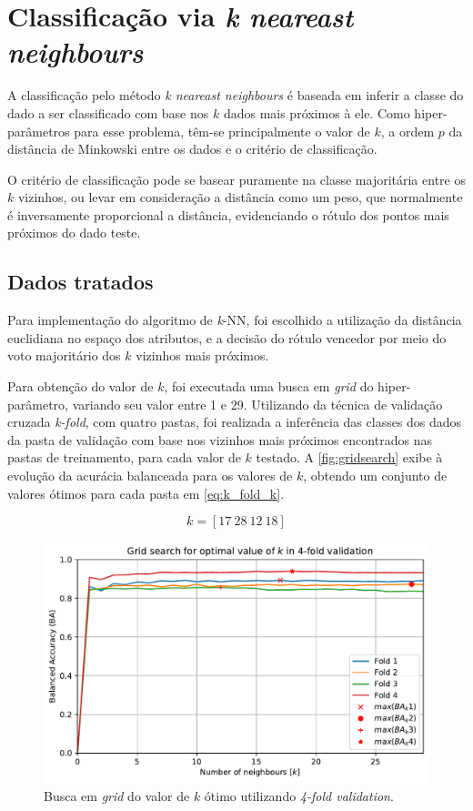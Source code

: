 \clearpage
\section{Classificação via \textit{k neareast neighbours}}

A classificação pelo método \textit{k neareast neighbours} é baseada em inferir a classe do dado a ser classificado com base nos $k$ dados mais próximos à ele. Como hiper-parâmetros para esse problema, têm-se principalmente o valor de $k$, a ordem $p$ da distância de Minkowski entre os dados e o critério de classificação.

O critério de classificação pode se basear puramente na classe majoritária entre os $k$ vizinhos, ou levar em consideração a distância como um peso, que normalmente é inversamente proporcional a distância, evidenciando o rótulo dos pontos mais próximos do dado teste.


\subsection{Dados tratados}

Para implementação do algoritmo de \textit{k}-NN, foi escolhido a utilização da distância euclidiana no espaço dos atributos, e a decisão do rótulo vencedor por meio do voto majoritário dos $k$ vizinhos mais próximos.

Para obtenção do valor de $k$, foi executada uma busca em \textit{grid} do hiper-parâmetro, variando seu valor entre 1 e 29. Utilizando da técnica de validação cruzada \textit{k-fold}, com quatro pastas, foi realizada a inferência das classes dos dados da pasta de validação com base nos vizinhos mais próximos encontrados nas pastas de treinamento, para cada valor de $k$ testado. A \autoref{fig:gridsearch} exibe à evolução da acurácia balanceada para os valores de $k$, obtendo um conjunto de valores ótimos para cada pasta em \eqref{eq:k_fold_k}.

\begin{equation}\label{eq:k_fold_k}
	k = [17\ 28\ 12\ 18]
\end{equation}


\begin{figure}[H]
	\centering
	\includegraphics[width=0.75\linewidth]{../../plot/knn_1/grid_search_k_fold}
	\caption{Busca em \textit{grid} do valor de $k$ ótimo utilizando \textit{4-fold validation}.}
	\label{fig:gridsearch}
\end{figure}

